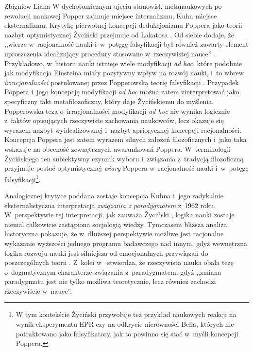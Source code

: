 \begin{artplenv}{Zbigniew Liana}
W dychotomicznym ujęciu stanowisk metanaukowych po rewolucji naukowej Popper zajmuje miejsce internalizmu, Kuhn miejsce
eksternalizmu. Krytykę pierwotnej koncepcji dedukcjonizmu Poppera jako teorii nazbyt optymistycznej Życiński przejmuje
od Lakatosa
\parencite[zob.][s.~120n]{zycinski_jezyk_1983}.
Od siebie dodaje, że  ,,wierze w~racjonalność
nauki i~w~potęgę falsyfikacji był również zawarty element uproszczenia idealizujący procedury stosowane w~rzeczywistej
nauce'' 
\parencite[s.~230]{zycinski_elementy_1996}.
Przykładowo, w~historii nauki istnieje wiele modyfikacji
\textit{ad hoc}, które podobnie jak modyfikacja Einsteina miały pozytywny wpływ na rozwój nauki, i~to wbrew
\textit{irracjonalności} postulowanej przez Popperowską teorię falsyfikacji
\parencite[zob.][s.~108]{zycinski_elementy_1996}.
Przypadek Poppera i~jego koncepcję modyfikacji \textit{ad hoc} można zatem zinterpretować jako specyficzny
fakt metafilozoficzny, który daje Życińskiemu do myślenia. Popperowska teza o~irracjonalności modyfikacji \textit{ad hoc}
nie wynika logicznie z~faktów opisujących rzeczywiste zachowania naukowców, lecz okazuje się wyrazem nazbyt
wyidealizowanej i~nazbyt apriorycznej koncepcji racjonalności. Koncepcja Poppera jest zatem wyrazem silnych założeń
filozoficznych i~jako taka wskazuje na obecność zewnętrznych uwarunkowań Poppera. W~terminologii Życińskiego ten
subiektywny czynnik wyboru i~związania z~tradycją filozoficzną przyjmuje postać optymistycznej \textit{wiary}
Poppera w~racjonalność nauki i~w~potęgę falsyfikacji\footnote{W tym kontekście Życiński przywołuje też przykład naukowych reakcji
na wynik eksperymentu EPR czy na  odkrycie nierówności Bella, których nie potraktowano jako falsyfikatory, jak to
powinno się stać w~myśli koncepcji Poppera.}.

Analogicznej krytyce poddana zostaje koncepcja Kuhna i~jego radykalnie eksternalistyczna interpretacja
\textit{związania z	paradygmatem} z~1962 roku. W~perspektywie tej interpretacji, jak zauważa Życiński 
\parencite*[s.~106]{zycinski_jezyk_1983},
logika nauki zostaje niemal całkowicie zastąpiona socjologią wiedzy. Tymczasem bliższa analiza
historyczna pokazuje, że w~dłuższej perspektywie możliwe jest racjonalne wykazanie wyższości jednego programu
badawczego nad innym, gdyż wewnętrzna logika rozwoju nauki jest silniejsza od emocjonalnych przywiązań do
poszczególnych teorii
\parencite*[s.~165]{zycinski_jezyk_1983}.
Z~kolei w~\parencite*[s.~195]{zycinski_elementy_1996}
stwierdza, że
rzeczywista nauka obala tezę o~dogmatycznym charakterze związania z~paradygmatem, gdyż ,,zmiana paradygmatu jest nie
tylko możliwa teoretycznie, lecz również zachodzi rzeczywiście w~nauce''.


\end{artplenv}

